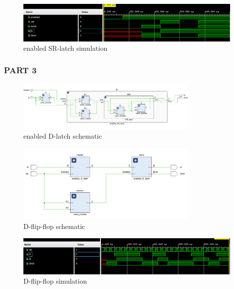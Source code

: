 \documentclass[pdftex,12pt,a4paper]{article}
\begin{document}
    \begin{figure}[H]
    	\centering
    	\includegraphics[width=1\textwidth]{simulations/enabled_sr_sim.png}	
    	\caption{enabled SR-latch simulation}
    	\label{enabled SR-latch simulation}
    \end{figure}

\subsubsection{PART 3}
\begin{figure}[H]
    	\centering
    	\includegraphics[width=0.8\textwidth]{schematic/D_latch_schem.png}	
    	\caption{enabled D-latch schematic}
    	\label{enabled D-latch schematic}
    \end{figure}
    
\begin{figure}[H]
    	\centering
    	\includegraphics[width=0.8\textwidth]{schematic/D_flip_schem.png}	
    	\caption{D-flip-flop schematic}
    	\label{D-flip-flop schematic}
    \end{figure}
    
    \begin{figure}[H]
    	\centering
    	\includegraphics[width=1\textwidth]{simulations/D_sim.png}	
    	\caption{D-flip-flop simulation}
    	\label{D-flip-flop simulation}
    \end{figure}
\end{document}
